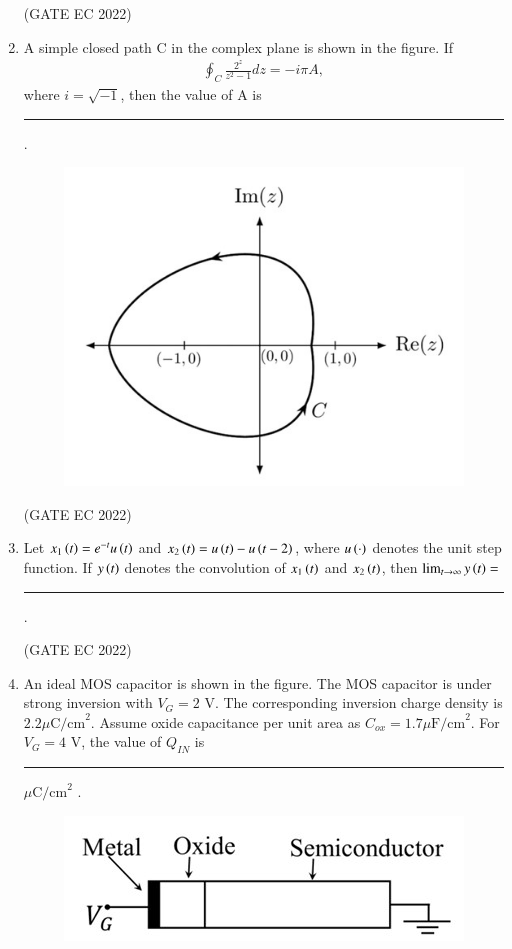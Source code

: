 \documentclass[journal,12pt,onecolumn]{IEEEtran}
\theoremstyle{remark}
\begin{document}
\begin{enumerate}
    \hfill{(GATE EC 2022)}

    \item A simple closed path C  in the complex plane is shown in the figure. If
    \begin{align*}
        \oint_C \frac{2^z}{z^2-1} dz = -i\pi A,
    \end{align*}
    where $i = \sqrt{-1}$, then the value of A is \rule{2cm}{0.4pt} .
    \begin{figure}[H]
        \centering
        \includegraphics[width=0.5\columnwidth]{figs/m15.jpg}
        \caption*{}
        \label{fig:m15}
    \end{figure}

    \hfill{(GATE EC 2022)}

    \item Let $x_1\left(t\right) = e^{-t}u\left(t\right)$ and $x_2\left(t\right) = u\left(t\right) - u\left(t-2\right)$, where $u\left(\cdot\right)$ denotes the unit step function.
    If $y\left(t\right)$ denotes the convolution of $x_1\left(t\right)$ and $x_2\left(t\right)$, then $\lim_{t\to\infty} y\left(t\right) =$ \rule{2cm}{0.4pt} .
    
    \hfill{(GATE EC 2022)}

    \item An ideal MOS capacitor  is shown in the figure.  The MOS capacitor is under strong inversion with $V_G = 2$ V. The corresponding inversion charge density  is $2.2  \mu\text{C/cm}^2$. Assume oxide capacitance per unit area as $C_{ox} = 1.7  \mu\text{F/cm}^2$. For $V_G = 4$ V, the value of $Q_{IN}$ is \rule{2cm}{0.4pt} $\mu\text{C/cm}^2$ .
    \begin{figure}[H]
        \centering
        \includegraphics[width=0.5\columnwidth]{figs/m16.jpg}
        \caption*{}
        \label{fig:m16}
    \end{figure}
    

\end{enumerate}
\end{document}
